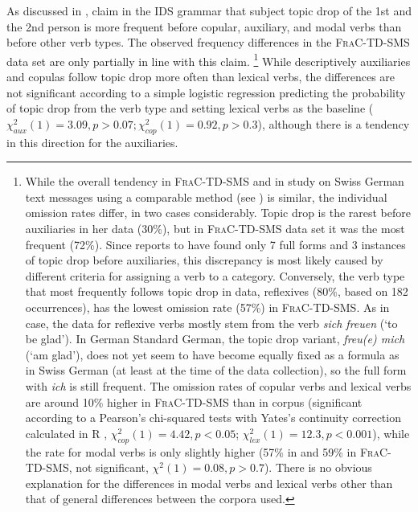 As discussed in , \citet[415]{zifonun.etal1997} claim in the IDS grammar that subject topic drop of the 1st and the 2nd person is more frequent before copular, auxiliary, and modal verbs than before other verb types.
The observed frequency differences in the \textsc{FraC-TD-SMS} data set are only partially in line with this claim.%
\footnote{While the overall tendency in \textsc{FraC-TD-SMS} and in  study on Swiss German text messages using a comparable method (see ) is similar, the individual omission rates differ, in two cases considerably.
Topic drop is the rarest before auxiliaries in her data (30\%), but in \textsc{FraC-TD-SMS} data set it was the most frequent (72\%).
Since \citet{frick2017} reports to have found only 7 full forms and 3 instances of topic drop before auxiliaries, this discrepancy is most likely caused by different criteria for assigning a verb to a category.
Conversely, the verb type that most frequently follows topic drop in  data, reflexives (80\%, based on 182 occurrences), has the lowest omission rate (57\%) in \textsc{FraC-TD-SMS}.
As in  case, the data for reflexive verbs mostly stem from the verb \textit{sich freuen} (`to be glad').
In German Standard German, the topic drop variant, \textit{freu(e) mich} (`am glad'), does not yet seem to have become equally fixed as a formula as in Swiss German (at least at the time of the data collection), so the full form with \textit{ich} is still frequent.
The omission rates of copular verbs and lexical verbs are around 10\% higher in \textsc{FraC-TD-SMS} than in  corpus (significant according to a Pearson's chi-squared tests with Yates's continuity correction calculated in R \citep{rcoreteam2021}, $\chi^2_{cop} (1) = 4.42, p < 0.05$; $\chi^2_{lex}(1) = 12.3, p < 0.001$), while the rate for modal verbs is only slightly higher (57\% in \citet{frick2017} and 59\% in \textsc{FraC-TD-SMS}, not significant, $\chi^2(1) = 0.08, p > 0.7$).
There is no obvious explanation for the differences in modal verbs and lexical verbs other than that of general differences between the corpora used.}
While descriptively auxiliaries and copulas follow topic drop more often than lexical verbs, the differences are not significant according to a simple logistic regression predicting the probability of topic drop from the verb type and setting lexical verbs as the baseline ($\chi^2_{aux} (1) = 3.09, p > 0.07; \chi^2_{cop} (1) = 0.92, p > 0.3$), although there is a tendency in this direction for the auxiliaries.
